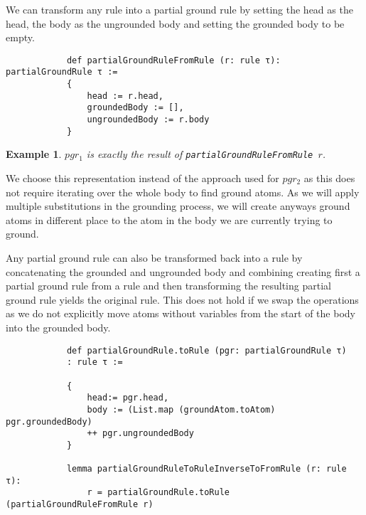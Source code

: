 \documentclass{article}
\newtheorem{example}{Example}
\begin{document}
        We can transform any rule into a partial ground rule by setting the head as the head, the body as the ungrounded body and setting the grounded body to be empty.

        \begin{lstlisting}
            def partialGroundRuleFromRule (r: rule τ): partialGroundRule τ :=
            {
                head := r.head, 
                groundedBody := [],
                ungroundedBody := r.body
            }
        \end{lstlisting}

        \begin{example}
            $pgr_1$ is exactly the result of \texttt{partialGroundRuleFromRule $r$}.
        \end{example}

        We choose this representation instead of the approach used for $pgr_2$ as this does not require iterating over the whole body to find ground atoms. As we will apply multiple substitutions in the grounding process, we will create anyways ground atoms in different place to the atom in the body we are currently trying to ground.

        Any partial ground rule can also be transformed back into a rule by concatenating the grounded and ungrounded body and combining creating first a partial ground rule from a rule and then transforming the resulting partial ground rule yields the original rule. This does not hold if we swap the operations as we do not explicitly move atoms without variables from the start of the body into the grounded body.

        \begin{lstlisting}
            def partialGroundRule.toRule (pgr: partialGroundRule τ)
            : rule τ :=
    
            {
                head:= pgr.head, 
                body := (List.map (groundAtom.toAtom) pgr.groundedBody)
                ++ pgr.ungroundedBody
            }

            lemma partialGroundRuleToRuleInverseToFromRule (r: rule τ): 
                r = partialGroundRule.toRule (partialGroundRuleFromRule r)
        \end{lstlisting}
\end{document}
